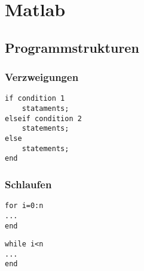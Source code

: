 
\section{Matlab}

\subsection{Programmstrukturen}

\subsubsection{Verzweigungen}
\begin{lstlisting}[caption=if-Verzweigung, label=if]
if condition 1
    stataments;
elseif condition 2
    statements;
else
    statements;
end
\end{lstlisting}

\subsubsection{Schlaufen}
\begin{lstlisting}[caption=for-Schlaufe, label=for-loop]
for i=0:n
...
end
\end{lstlisting}

\begin{lstlisting}[caption=while-Schlaufe, label=while-loop]
while i<n
...
end
\end{lstlisting}

